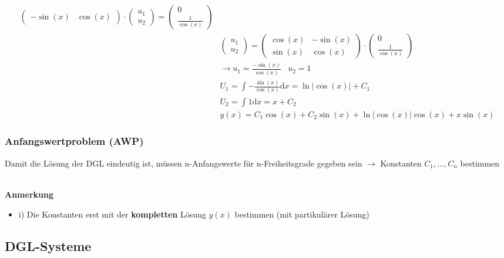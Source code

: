 \documentclass[8pt, a4paper, landscape, fleqn]{scrartcl}
\newenvironment {example}
				{\begin{itshape} \begin{small}}
				{\end{small} \end{itshape}}
\newenvironment {annotation}[1]
				{\begin{itshape} \begin{small} \textbf{#1} \begin{itemize}}
				{\end{itemize} \end{small} \end{itshape}}
\begin{document}
\begin{multicols*}{3}
\begin{itemize}
\begin{example}
\begin{align*}
\begin{pmatrix}
								-\sin(x) &\cos(x)
							\end{pmatrix}
							\cdot 
							\begin{pmatrix}
								u_1\\ u_2
							\end{pmatrix}
							=
							\begin{pmatrix}
								0\\ \frac{1}{\cos(x)}
							\end{pmatrix}\\
							&\begin{pmatrix}
								u_1\\ u_2
							\end{pmatrix}
							=
							\begin{pmatrix}
								\cos(x) &-\sin(x)\\
								\sin(x) &\cos(x)
							\end{pmatrix}
							\cdot
							\begin{pmatrix}
								0\\ \frac{1}{\cos(x)}
							\end{pmatrix}\\
							&\rightarrow u_1=\frac{-\sin(x)}{\cos(x)} \hspace{10pt} u_2=1\\
							&U_1=\int -\frac{\sin(x)}{\cos(x)} \text{d}x=\ln \vert \cos(x) \vert + C_1\\
							&U_2=\int 1  \text{d}x= x+C_2\\
							&y(x)=C_1\cos(x)+C_2\sin(x) +\ln \vert \cos(x) \vert \cos(x) + x\sin(x)
						\end{align*}				
					\end{example}
				\end{itemize}
				\subsubsection{Anfangswertproblem (AWP)}
					Damit die Lösung der DGL eindeutig ist, müssen n-Anfangswerte für n-Freiheitsgrade gegeben sein $\rightarrow$ Konstanten $C_1, \dots, C_n$ bestimmen\\\\
					\begin{annotation}{Anmerkung}
						\item [i)] Die Konstanten erst mit der \textbf{kompletten} Lösung $y(x)$ bestimmen (mit partikulärer Lösung)
					\end{annotation}
			\subsection{DGL-Systeme}

\end{multicols*}
\end{document}
